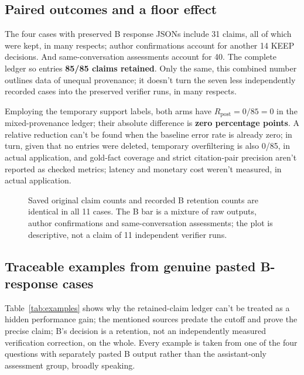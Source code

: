 \documentclass[12pt,a4paper]{article}
\begin{document}
\subsection{Paired outcomes and a floor effect}
The four cases with preserved B response JSONs include 31 claims, all of which were kept, in many respects; author confirmations account for another 14 KEEP decisions. And same-conversation assessments account for 40. The complete ledger so entries \textbf{85/85 claims retained}. Only the same, this combined number outlines data of unequal provenance; it doesn't turn the seven less independently recorded cases into the preserved verifier runs, in many respects.

Employing the temporary support labels, both arms have $R_{\mathrm{post}}=0/85=0$ in the mixed-provenance ledger; their absolute difference is \textbf{zero percentage points}. A relative reduction can't be found when the baseline error rate is already zero; in turn, given that no entries were deleted, temporary overfiltering is also 0/85, in actual application, and gold-fact coverage and strict citation-pair precision aren't reported as checked metrics; latency and monetary cost weren't measured, in actual application.

\begin{figure}[ht]
\centering
{}
\caption{Saved original claim counts and recorded B retention counts are identical in all 11 cases. The B bar is a mixture of raw outputs, author confirmations and same-conversation assessments; the plot is descriptive, not a claim of 11 independent verifier runs.}
\label{fig:retention}
\end{figure}

\subsection{Traceable examples from genuine pasted B-response cases}
Table~\ref{tab:examples} shows why the retained-claim ledger can't be treated as a hidden performance gain; the mentioned sources predate the cutoff and prove the precise claim; B's decision is a retention, not an independently measured verification correction, on the whole. Every example is taken from one of the four questions with separately pasted B output rather than the assistant-only assessment group, broadly speaking.
\end{document}
